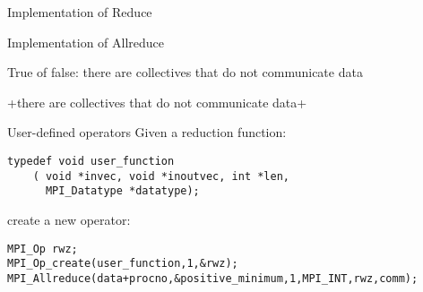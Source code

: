\begin{numberedframe}{Implementation of Reduce}
  \footnotesize
  
\end{numberedframe}

\begin{numberedframe}{Implementation of Allreduce}
  \footnotesize
  
\end{numberedframe}

\begin{reviewframe}
  True of false: there are collectives that do not communicate data

  \slackpollTF+there are collectives that do not communicate data+
\end{reviewframe}


\begin{numberedframe}{User-defined operators}
\lstset{language=C}
Given a reduction function:
\begin{lstlisting}
typedef void user_function
    ( void *invec, void *inoutvec, int *len, 
      MPI_Datatype *datatype); 
\end{lstlisting}  
create a new operator:
\begin{lstlisting}
MPI_Op rwz;
MPI_Op_create(user_function,1,&rwz);
MPI_Allreduce(data+procno,&positive_minimum,1,MPI_INT,rwz,comm);
\end{lstlisting}
\end{numberedframe}

\begin{exerciseframe}[onenorm]
  
\end{exerciseframe}

\endinput

\begin{numberedframe}{}
\begin{lstlisting}
  
\end{lstlisting}
\end{numberedframe}

\begin{numberedframe}{}
\begin{lstlisting}
  
\end{lstlisting}
\end{numberedframe}

\begin{numberedframe}{}
\begin{verbatim}
  
\end{verbatim}
\end{numberedframe}

